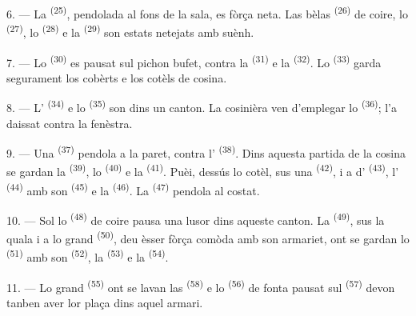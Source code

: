 \VUsaut{4.0mm}
\VUsaut{3.0mm}

6. --- La  \textsuperscript{(25)}, pendolada al fons de
la sala, es fòrça neta. Las bèlas  \textsuperscript{(26)} de
coire, lo  \textsuperscript{(27)}, lo 
\textsuperscript{(28)} e la  \textsuperscript{(29)} son estats
netejats amb suènh.

7. --- Lo  \textsuperscript{(30)} es pausat sul pichon bufet, contra
la  \textsuperscript{(31)} e la 
\textsuperscript{(32)}. Lo  \textsuperscript{(33)} garda
segurament los cobèrts e los cotèls de cosina.

8. --- L' \textsuperscript{(34)} e lo 
\textsuperscript{(35)} son dins un canton. La cosinièra ven d'emplegar lo
 \textsuperscript{(36)}; l'a daissat contra la fenèstra.

9. --- Una  \textsuperscript{(37)} pendola a la paret,
contra l' \textsuperscript{(38)}. Dins aquesta partida de la cosina
se gardan la  \textsuperscript{(39)}, lo
 \textsuperscript{(40)} e la 
\textsuperscript{(41)}. Puèi, dessús lo cotèl, sus una 
\textsuperscript{(42)}, i a d' \textsuperscript{(43)},
l' \textsuperscript{(44)} amb son 
\textsuperscript{(45)} e la  \textsuperscript{(46)}. La
 \textsuperscript{(47)} pendola al costat.

10. --- Sol lo  \textsuperscript{(48)} de coire pausa una lusor
dins aqueste canton. La  \textsuperscript{(49)}, sus la quala i a lo
grand  \textsuperscript{(50)}, deu èsser fòrça comòda amb son
armariet, ont se gardan lo  \textsuperscript{(51)} amb
son  \textsuperscript{(52)}, la 
\textsuperscript{(53)} e la  \textsuperscript{(54)}.

\VUsaut{4.0mm}
\VUsaut{3.0mm}

11. --- Lo grand  \textsuperscript{(55)} ont se lavan las
 \textsuperscript{(58)} e lo 
\textsuperscript{(56)} de fonta pausat sul 
\textsuperscript{(57)} devon tanben aver lor plaça dins aquel armari.

